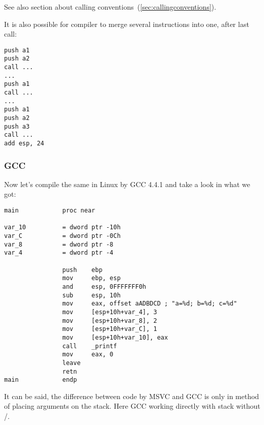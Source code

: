 {See also section about calling conventions}~(\ref{sec:callingconventions}).

{It is also possible for compiler to merge several  instructions into one, after last call:}

\begin{lstlisting}
push a1
push a2
call ...
...
push a1
call ...
...
push a1
push a2
push a3
call ...
add esp, 24
\end{lstlisting}

\subsubsection{GCC}

{Now let's compile the same in Linux by GCC 4.4.1 and take a look in \IDA what we got:}

\begin{lstlisting}
main            proc near

var_10          = dword ptr -10h
var_C           = dword ptr -0Ch
var_8           = dword ptr -8
var_4           = dword ptr -4

                push    ebp
                mov     ebp, esp
                and     esp, 0FFFFFFF0h
                sub     esp, 10h
                mov     eax, offset aADBDCD ; "a=%d; b=%d; c=%d"
                mov     [esp+10h+var_4], 3
                mov     [esp+10h+var_8], 2
                mov     [esp+10h+var_C], 1
                mov     [esp+10h+var_10], eax
                call    _printf
                mov     eax, 0
                leave
                retn
main            endp
\end{lstlisting}

{It can be said, the difference between code by MSVC and GCC is only in method of placing arguments on the stack.
Here GCC working directly with stack without \PUSH/\POP.}
